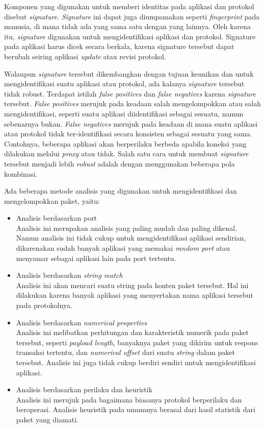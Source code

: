 Komponen yang digunakan untuk memberi identitas pada aplikasi dan protokol disebut \textit{signature}. \textit{Signature} ini dapat juga diumpamakan seperti \textit{fingerprint} pada manusia, di mana tidak ada yang sama satu dengan yang lainnya. Oleh karena itu, \textit{signature} digunakan untuk mengidentifikasi aplikasi dan protokol. Signature pada aplikasi harus dicek secara berkala, karena signature tersebut dapat berubah seiring aplikasi \textit{update} atau revisi protokol.

Walaupun \textit{signature} tersebut dikembangkan dengan tujuan keunikan dan untuk mengidentifikasi suatu aplikasi atau protokol, ada kalanya \textit{signature} tersebut tidak robust. Terdapat istilah \textit{false positives} dan \textit{false negatives} karena \textit{signature} tersebut. \textit{False positives} merujuk pada keadaan salah mengelompokkan atau salah mengidentifikasi, seperti suatu aplikasi diidentifikasi sebagai sesuatu, namun sebenarnya bukan. \textit{False negatives} merujuk pada keadaan di mana suatu aplikasi atau protokol tidak ter-identifikasi secara konsisten sebagai sesuatu yang sama. Contohnya, beberapa aplikasi akan berperilaku berbeda apabila koneksi yang dilakukan melalui \textit{proxy} atau tidak. Salah satu cara untuk membuat \textit{signature} tersebut menjadi lebih \textit{robust} adalah dengan menggunakan beberapa pola kombinasi.

Ada beberapa metode analisis yang digunakan untuk mengidentifikasi dan mengelompokkan paket, yaitu:
\begin{itemize}
	\item Analisis berdasarkan port\\
	Analisis ini merupakan analisis yang paling mudah dan paling dikenal. Namun analisis ini tidak cukup untuk mengidentifikasi aplikasi sendirian, dikarenakan sudah banyak aplikasi yang memakai \textit{random port} atau menyamar sebagai aplikasi lain pada port tertentu.
	\item Analisis berdasarkan \textit{string match}\\
	Analisis ini akan mencari suatu string pada konten paket tersebut. Hal ini dilakukan karena banyak aplikasi yang menyertakan nama aplikasi tersebut pada protokolnya. 
	\item Analisis berdasarkan \textit{numerical properties}\\
	Analisis ini melibatkan perhitungan dan karakteristik numerik pada paket tersebut, seperti \textit{payload length}, banyaknya paket yang dikirim untuk respons transaksi tertentu, dan \textit{numerical offset} dari suatu \textit{string} dalam paket tersebut. Analisis ini juga tidak cukup berdiri sendiri untuk mengidentifikasi aplikasi.
	\item Analisis berdasarkan perilaku dan heuristik\\
	Analisis ini merujuk pada bagaimana biasanya protokol berperilaku dan beroperasi. Analisis heuristik pada umumnya berasal dari hasil statistik dari paket yang diamati.
\end{itemize}

